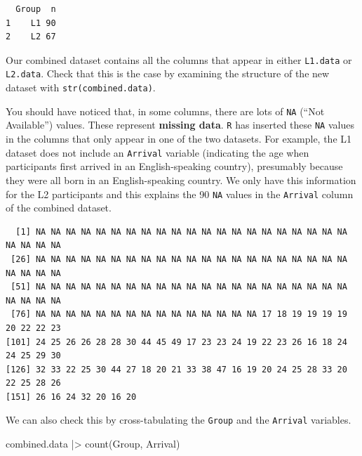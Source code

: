 \documentclass[
  letterpaper,
  DIV=11,
  numbers=noendperiod]{scrreprt}
\newenvironment{Shaded}{\begin{snugshade}}{\end{snugshade}}
\newcommand{\FunctionTok}[1]{\textcolor[rgb]{0.28,0.35,0.67}{#1}}
\newcommand{\NormalTok}[1]{\textcolor[rgb]{0.00,0.23,0.31}{#1}}
\newcommand{\SpecialCharTok}[1]{\textcolor[rgb]{0.37,0.37,0.37}{#1}}
\begin{document}
\begin{verbatim}
  Group  n
1    L1 90
2    L2 67
\end{verbatim}

Our combined dataset contains all the columns that appear in either
\texttt{L1.data} or \texttt{L2.data}. Check that this is the case by
examining the structure of the new dataset with
\texttt{str(combined.data)}.

You should have noticed that, in some columns, there are lots of
\texttt{NA} (``Not Available'') values. These represent \textbf{missing
data}. \texttt{R} has inserted these \texttt{NA} values in the columns
that only appear in one of the two datasets. For example, the L1 dataset
does not include an \texttt{Arrival} variable (indicating the age when
participants first arrived in an English-speaking country), presumably
because they were all born in an English-speaking country. We only have
this information for the L2 participants and this explains the 90
\texttt{NA} values in the \texttt{Arrival} column of the combined
dataset.

\begin{Shaded}
\end{Shaded}

\begin{verbatim}
  [1] NA NA NA NA NA NA NA NA NA NA NA NA NA NA NA NA NA NA NA NA NA NA NA NA NA
 [26] NA NA NA NA NA NA NA NA NA NA NA NA NA NA NA NA NA NA NA NA NA NA NA NA NA
 [51] NA NA NA NA NA NA NA NA NA NA NA NA NA NA NA NA NA NA NA NA NA NA NA NA NA
 [76] NA NA NA NA NA NA NA NA NA NA NA NA NA NA NA 17 18 19 19 19 19 20 22 22 23
[101] 24 25 26 26 28 28 30 44 45 49 17 23 23 24 19 22 23 26 16 18 24 24 25 29 30
[126] 32 33 22 25 30 44 27 18 20 21 33 38 47 16 19 20 24 25 28 33 20 22 25 28 26
[151] 26 16 24 32 20 16 20
\end{verbatim}

We can also check this by cross-tabulating the \texttt{Group} and the
\texttt{Arrival} variables.

\begin{Shaded}
\begin{Highlighting}[]
\NormalTok{combined.data }\SpecialCharTok{|\textgreater{}} 
  \FunctionTok{count}\NormalTok{(Group, Arrival)}
\end{Highlighting}
\end{Shaded}
\end{document}
